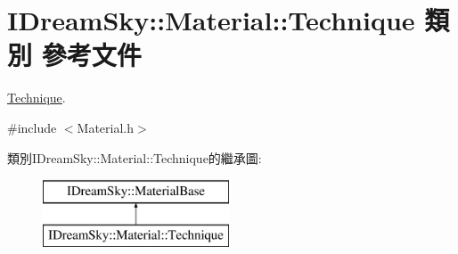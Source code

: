 \hypertarget{class_i_dream_sky_1_1_material_1_1_technique}{}\section{I\+Dream\+Sky\+:\+:Material\+:\+:Technique 類別 參考文件}
\label{class_i_dream_sky_1_1_material_1_1_technique}


\hyperlink{class_i_dream_sky_1_1_material_1_1_technique}{Technique}.  




{\ttfamily \#include $<$Material.\+h$>$}

類別\+I\+Dream\+Sky\+:\+:Material\+:\+:Technique的繼承圖\+:\begin{figure}[H]
\begin{center}
\leavevmode
\includegraphics[height=2.000000cm]{class_i_dream_sky_1_1_material_1_1_technique}
\end{center}
\end{figure}
